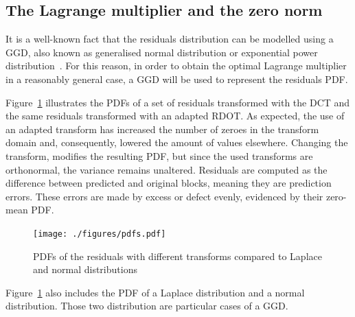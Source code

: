 \documentclass[11pt,a4paper,openright,twoside]{book}
\numberwithin{equation}{section} %
\begin{document}
\subsection{The Lagrange multiplier and the zero norm}
\label{sub:the_lagrange_multiplier}

It is a well-known fact that the residuals distribution can be modelled
using a \ac{GGD}, also known as generalised normal distribution or
exponential power
distribution~\cite{lam-00-dct-coefficient-distribution,
yovanof-96-analysis-dct-coefficients}.
For this reason, in order to obtain the optimal Lagrange multiplier in a
reasonably general case, a \ac{GGD} will be used to represent the
residuals \ac{PDF}.

Figure~\ref{fig:probability_density_functions} illustrates the \acp{PDF}
of a set of residuals transformed with the \ac{DCT} and the same residuals
transformed with an adapted \ac{RDOT}.
As expected, the use of an adapted transform has increased the number
of zeroes in the transform domain and, consequently, lowered the amount
of values elsewhere.
Changing the transform, modifies the resulting \ac{PDF}, but
since the used transforms are orthonormal, the variance remains
unaltered.
Residuals are computed as the difference between predicted and original
blocks, meaning they are prediction errors.
These errors are made by excess or defect evenly, evidenced by their
zero-mean \ac{PDF}.
\begin{figure}[tb]
	\centering
	\texttt{[image: ./figures/pdfs.pdf]}
	\caption{\acsp{PDF} of the residuals with different transforms
	compared to Laplace and normal distributions}
	\label{fig:probability_density_functions}
\end{figure}
Figure~\ref{fig:probability_density_functions} also includes the
\ac{PDF} of a Laplace distribution and a normal distribution.
Those two distribution are particular cases of a \ac{GGD}.
\end{document}
